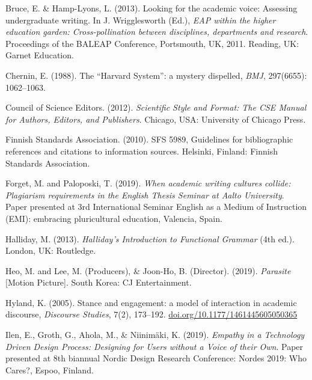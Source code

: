 \documentclass[finnish, 12pt, a4paper, elec, utf8, a-2b, online]{aaltothesis}
\begin{document}
\vspace{1ex}
\noindent
Bruce, E. \& Hamp-Lyons, L. (2013). 
Looking for the academic voice: Assessing undergraduate writing. 
In J. Wrigglesworth (Ed.), 
\textit{EAP within the higher education garden: Cross-pollination between 
	disciplines, departments and research}. 
Proceedings of the BALEAP Conference, Portsmouth, UK, 2011. Reading, UK: Garnet
Education.

\vspace{1ex}
\noindent
Chernin, E. (1988). 
The “Harvard System”: a mystery dispelled, \textit{BMJ}, 297(6655): 1062--1063.

\vspace{1ex}
\noindent
Council of Science Editors. (2012). 
\textit{Scientific Style and Format: The CSE Manual for Authors, Editors, and
	Publishers}. 
Chicago, USA: University of Chicago Press.

\vspace{1ex}
\noindent
Finnish Standards Association. (2010). SFS 5989, Guidelines for bibliographic 
references and citations to information sources. Helsinki, Finland: Finnish 
Standards Association.

\vspace{1ex}
\noindent
Forget, M. and Paloposki, T. (2019). 
\textit{When academic writing cultures collide: Plagiarism requirements in the 
	English Thesis Seminar at Aalto University}. 
Paper presented at 3rd International Seminar English as a Medium of Instruction 
(EMI): embracing pluricultural education, Valencia, Spain.

\vspace{1ex}
\noindent
Halliday, M. (2013). \textit{Halliday’s Introduction to Functional Grammar} 
(4th ed.). London, UK: Routledge.

\vspace{1ex}
\noindent
Heo, M. and Lee, M. (Producers), \& Joon-Ho, B. (Director). (2019). 
\textit{Parasite} [Motion Picture]. South Korea: CJ Entertainment.

\vspace{1ex}
\noindent
Hyland, K. (2005). 
Stance and engagement: a model of interaction in academic discourse, 
\textit{Discourse Studies}, 7(2), 173--192. 
\url{doi.org/10.1177/1461445605050365}

\vspace{1ex}
\noindent
Ilen, E., Groth, G., Ahola, M., \& Niinimäki, K. (2019). 
\textit{Empathy in a Technology Driven Design Process: Designing for Users 
	without a Voice of their Own}. 
Paper presented at 8th biannual Nordic Design Research Conference: Nordes 2019: 
Who Cares?, Espoo, Finland.
\end{document}
